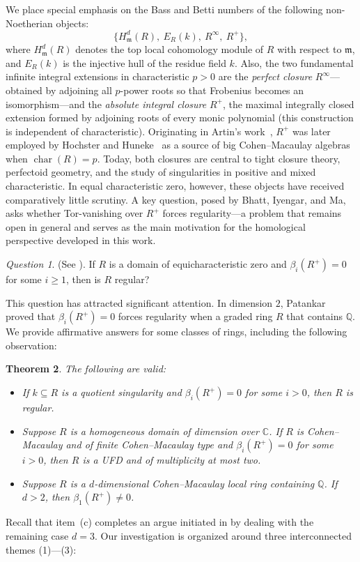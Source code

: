 \documentclass[11pt,a4paper]{amsart}
\numberwithin{equation}{section}
\newtheorem{theorem}{Theorem}[section]
\theoremstyle{definition}
\theoremstyle{remark}
\newtheorem{question}[theorem]{Question}\newtheorem{discussion}[theorem]{Discussion}
\newcommand{\fm}{\mathfrak{m}}
\begin{document}
We place special emphasis on the Bass and Betti numbers of the following non-Noetherian objects:
\[
\big\{H^d_{\mathfrak m}(R),\ E_R(k),\ R^\infty,\ R^+\big\},
\]where \(H^d_{\mathfrak m}(R)\) denotes the top local cohomology module of $R$ with respect to $\fm$,
and \(E_R(k)\) is the injective hull of the residue field \(k\). Also, the two fundamental infinite integral extensions in characteristic \(p>0\) are the \emph{perfect closure} \(R^\infty\)—obtained by adjoining all \(p\)-power roots so that Frobenius becomes an isomorphism—and the \emph{absolute integral closure} \(R^+\), the maximal integrally closed extension formed by adjoining roots of every monic polynomial (this construction is independent of characteristic). Originating in Artin's work~\cite{Ar}, \(R^+\) was later employed by Hochster and Huneke~\cite{HH} as a source of big Cohen–Macaulay algebras when \(\operatorname{char}(R)=p\). Today, both closures are central to tight closure theory, perfectoid geometry, and the study of singularities in positive and mixed characteristic. 
In equal characteristic zero, however, these objects have received comparatively little scrutiny. A key question, posed by Bhatt, Iyengar, and Ma, asks whether Tor-vanishing over \(R^+\) forces regularity—a problem that remains open in general and serves as the main motivation for the homological perspective developed in this work.
	
	\begin{question}\label{Bim}(See \cite{Bim}).
	If \( R \) is a  domain of equicharacteristic zero   and \(\beta_i(R^+)=0\) for some \(i \geq 1\), then is \(R\) regular?
\end{question}
	
	This question has attracted significant attention. In dimension \(2\), Patankar \cite{p} proved that \(\beta_i(R^+)=0\) forces regularity when a graded ring \(R\) that contains \(\mathbb{Q}\). 
	We provide affirmative answers for some classes of rings, including the following observation: \begin{theorem}\label{17}The following are valid:
		\begin{itemize}
			\item[(a)] If \(k\subseteq R\)  is a quotient singularity and \(\beta_i(R^+)=0\) for some \(i>0\), then \(R\) is regular.
			\item[(b)] 
		
			Suppose \(R\) is a homogeneous domain of dimension  over $\mathbb{C}$. If \(R\) is Cohen--Macaulay and of finite Cohen--Macaulay type and \(\beta_i(R^+)=0\) for some \(i>0\), then 
			\(R\) is a UFD and of multiplicity at most two. 
	\item[(c)] 	Suppose \(R\) is a \(d\)-dimensional Cohen--Macaulay local ring containing \(\mathbb{Q}\). If \(d>2\), then \(\beta_1(R^+)\neq 0\).	\end{itemize}
		
	\end{theorem}
Recall that item~(c) completes an argue initiated in \cite{p} by dealing with the remaining  case $d=3$.
Our investigation is organized around three interconnected themes (1)---(3):
	
\end{document}
